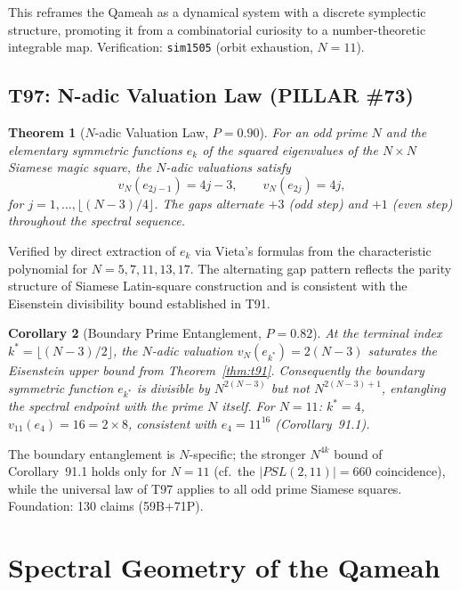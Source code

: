\documentclass[aps,prd,twocolumn,superscriptaddress,floatfix,nofootinbib]{revtex4-2}
\newtheorem{theorem}{Theorem}
\newtheorem{corollary}[theorem]{Corollary}
\theoremstyle{definition}
\theoremstyle{remark}
\begin{document}
This reframes the Qameah as a dynamical system with a discrete symplectic
structure, promoting it from a combinatorial curiosity to a number-theoretic
integrable map.  Verification: \texttt{sim1505} (orbit exhaustion, $N=11$).

\subsection{T97: N-adic Valuation Law (PILLAR \#73)}
\label{sec:t97-nadic-valuation}

\begin{theorem}[$N$-adic Valuation Law, $P{=}0.90$]
\label{thm:t97}
For an odd prime $N$ and the elementary symmetric functions $e_k$ of the
squared eigenvalues of the $N{\times}N$ Siamese magic square, the $N$-adic
valuations satisfy
\[
  v_N(e_{2j-1}) = 4j-3, \qquad v_N(e_{2j}) = 4j,
\]
for $j=1,\ldots,\lfloor(N-3)/4\rfloor$.  The gaps alternate $+3$ (odd step)
and $+1$ (even step) throughout the spectral sequence.
\end{theorem}

Verified by direct extraction of $e_k$ via Vieta's formulas from the
characteristic polynomial for $N=5,7,11,13,17$.  The alternating gap pattern
reflects the parity structure of Siamese Latin-square construction and is
consistent with the Eisenstein divisibility bound established in T91.

\begin{corollary}[Boundary Prime Entanglement, $P{=}0.82$]
\label{cor:t97-boundary}
At the terminal index $k^* = \lfloor(N-3)/2\rfloor$, the $N$-adic valuation
$v_N(e_{k^*}) = 2(N-3)$ saturates the Eisenstein upper bound from
Theorem~\ref{thm:t91}.  Consequently the boundary symmetric function
$e_{k^*}$ is divisible by $N^{2(N-3)}$ but not $N^{2(N-3)+1}$, entangling
the spectral endpoint with the prime $N$ itself.  For $N=11$:
$k^*=4$, $v_{11}(e_4)=16=2\times 8$, consistent with $e_4=11^{16}$
(Corollary~91.1).
\end{corollary}

The boundary entanglement is $N$-specific; the stronger $N^{4k}$ bound of
Corollary~91.1 holds only for $N=11$ (cf.\ the $|PSL(2,11)|=660$ coincidence),
while the universal law of T97 applies to all odd prime Siamese squares.
Foundation: 130 claims (59B+71P).

\section{Spectral Geometry of the Qameah}
\label{sec:spectral-geometry}
\end{document}
